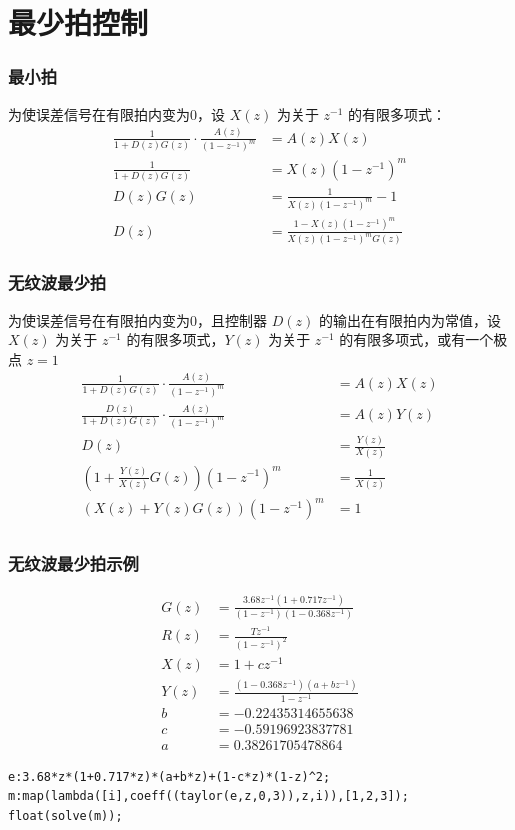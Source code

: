 \documentclass{beamer}
\begin{document}
\section{最少拍控制}
\label{sec-9}
\begin{frame}
\frametitle{最小拍}
\label{sec-9-1}

为使误差信号在有限拍内变为0，设 $X(z)$ 为关于 $z^{-1}$ 的有限多项式：
\begin{align*}
\frac{1}{1+D(z)G(z)}\cdot\frac{A(z)}{(1-z^{-1})^m} &=A(z)X(z) \\
\frac{1}{1+D(z)G(z)} &=X(z){(1-z^{-1})^m} \\
D(z)G(z) &= \frac{1}{X(z)(1-z^{-1})^m}-1 \\
D(z) &= \frac{1-X(z)(1-z^{-1})^m}{X(z)(1-z^{-1})^m G(z)} 
\end{align*}
\end{frame}
\begin{frame}
\frametitle{无纹波最少拍}
\label{sec-9-2}

为使误差信号在有限拍内变为0，且控制器 $D(z)$ 的输出在有限拍内为常值，设 $X(z)$ 为关于 $z^{-1}$ 的有限多项式，$Y(z)$ 为关于 $z^{-1}$ 的有限多项式，或有一个极点 $z=1$ 
\begin{align*}
\frac{1}{1+D(z)G(z)}\cdot\frac{A(z)}{(1-z^{-1})^m} &=A(z)X(z) \\
\frac{D(z)}{1+D(z)G(z)}\cdot\frac{A(z)}{(1-z^{-1})^m} &=A(z)Y(z) \\
D(z) &= \frac{Y(z)}{X(z)}\\
(1+\frac{Y(z)}{X(z)}G(z))(1-z^{-1})^m &=\frac{1}{X(z)}\\
(X(z)+Y(z)G(z))(1-z^{-1})^m &=1\\
\end{align*}
\end{frame}
\begin{frame}[fragile]
\frametitle{无纹波最少拍示例}
\label{sec-9-3}

\begin{align*}
G(z) &=\frac{3.68z^{-1}(1+0.717z^{-1})}{(1-z^{-1})(1-0.368z^{-1})} \\
R(z) &=\frac{Tz^{-1}}{(1-z^{-1})^2} \\
X(z) &= 1+cz^{-1}\\
Y(z) &= \frac{(1-0.368z^{-1})(a+bz^{-1})}{1-z^{-1}}\\
b &=-0.22435314655638\\
c &=-0.59196923837781\\
a &=0.38261705478864
\end{align*}

\begin{verbatim}
e:3.68*z*(1+0.717*z)*(a+b*z)+(1-c*z)*(1-z)^2;
m:map(lambda([i],coeff((taylor(e,z,0,3)),z,i)),[1,2,3]);
float(solve(m));
\end{verbatim}
\end{frame}
\end{document}
